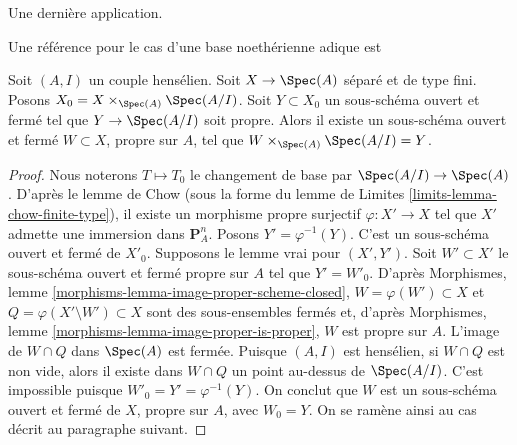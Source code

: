 \noindent
Une dernière application.

\begin{lemma}
\label{lemma-split-off-proper-part-henselian}
\begin{reference}
Une référence pour le cas d'une base noethérienne adique est
\cite[III, Proposition 5.5.1]{EGA}
\end{reference}
Soit $(A, I)$ un couple hensélien. Soit $X \to \Spec(A)$
séparé et de type fini. Posons $X_0 = X \times_{\Spec(A)} \Spec(A/I)$.
Soit $Y \subset X_0$ un sous-schéma ouvert et fermé tel que
$Y \to \Spec(A/I)$ soit propre. Alors il existe un sous-schéma ouvert et fermé
$W \subset X$, propre sur $A$, tel que
$W \times_{\Spec(A)} \Spec(A/I) = Y$.
\end{lemma}

\begin{proof}
Nous noterons $T \mapsto T_0$ le changement de base par $\Spec(A/I) \to \Spec(A)$.
D'après le lemme de Chow (sous la forme du
lemme de Limites \ref{limits-lemma-chow-finite-type}),
il existe un morphisme propre surjectif $\varphi : X' \to X$ tel
que $X'$ admette une immersion dans $\mathbf{P}^n_A$.
Posons $Y' = \varphi^{-1}(Y)$. C'est un sous-schéma ouvert et fermé
de $X'_0$. Supposons le lemme vrai pour $(X', Y')$. Soit $W' \subset X'$
le sous-schéma ouvert et fermé propre sur $A$ tel que $Y' = W'_0$.
D'après Morphismes, lemme \ref{morphisms-lemma-image-proper-scheme-closed},
$W = \varphi(W') \subset X$ et
$Q = \varphi(X' \setminus W') \subset X$ sont des sous-ensembles fermés et, d'après
Morphismes, lemme \ref{morphisms-lemma-image-proper-is-proper},
$W$ est propre sur $A$. L'image de $W \cap Q$ dans $\Spec(A)$ est fermée.
Puisque $(A, I)$ est hensélien, si $W \cap Q$ est non vide, alors
il existe dans $W \cap Q$ un point au-dessus de $\Spec(A/I)$.
C'est impossible puisque $W'_0 = Y' = \varphi^{-1}(Y)$.
On conclut que $W$ est un sous-schéma ouvert et fermé
de $X$, propre sur $A$, avec $W_0 = Y$.
On se ramène ainsi au cas décrit au paragraphe suivant.


\end{proof}
